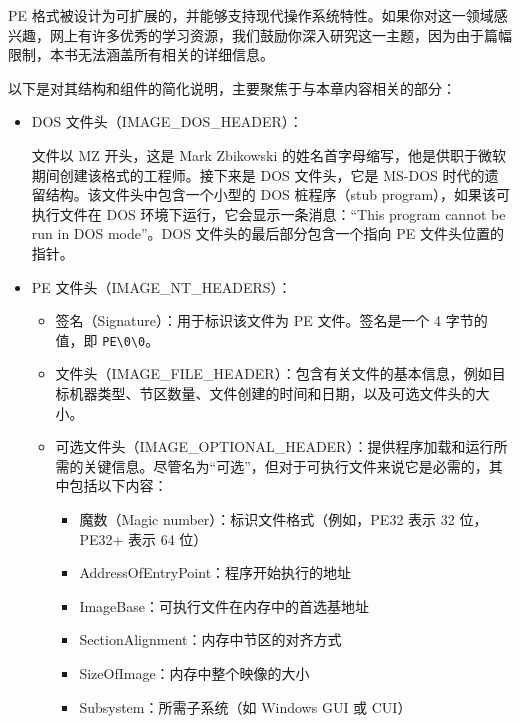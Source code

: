 PE 格式被设计为可扩展的，并能够支持现代操作系统特性。如果你对这一领域感兴趣，网上有许多优秀的学习资源，我们鼓励你深入研究这一主题，因为由于篇幅限制，本书无法涵盖所有相关的详细信息。

以下是对其结构和组件的简化说明，主要聚焦于与本章内容相关的部分：

\begin{itemize}
\item 
DOS 文件头（IMAGE\_DOS\_HEADER）：

文件以 MZ 开头，这是 Mark Zbikowski 的姓名首字母缩写，他是供职于微软期间创建该格式的工程师。接下来是 DOS 文件头，它是 MS-DOS 时代的遗留结构。该文件头中包含一个小型的 DOS 桩程序（stub program），如果该可执行文件在 DOS 环境下运行，它会显示一条消息：“This program cannot be run in DOS mode”。DOS 文件头的最后部分包含一个指向 PE 文件头位置的指针。

\item 
PE 文件头（IMAGE\_NT\_HEADERS）：

\begin{itemize}
\item 
签名（Signature）：用于标识该文件为 PE 文件。签名是一个 4 字节的值，即 \verb|PE\0\0|。

\item 
文件头（IMAGE\_FILE\_HEADER）：包含有关文件的基本信息，例如目标机器类型、节区数量、文件创建的时间和日期，以及可选文件头的大小。

\item 
可选文件头（IMAGE\_OPTIONAL\_HEADER）：提供程序加载和运行所需的关键信息。尽管名为“可选”，但对于可执行文件来说它是必需的，其中包括以下内容：

\begin{itemize}
\item 
魔数（Magic number）：标识文件格式（例如，PE32 表示 32 位，PE32+ 表示 64 位）

\item 
AddressOfEntryPoint：程序开始执行的地址

\item 
ImageBase：可执行文件在内存中的首选基地址

\item 
SectionAlignment：内存中节区的对齐方式

\item 
SizeOfImage：内存中整个映像的大小

\item 
Subsystem：所需子系统（如 Windows GUI 或 CUI）
\end{itemize}


\end{itemize}
\end{itemize}
